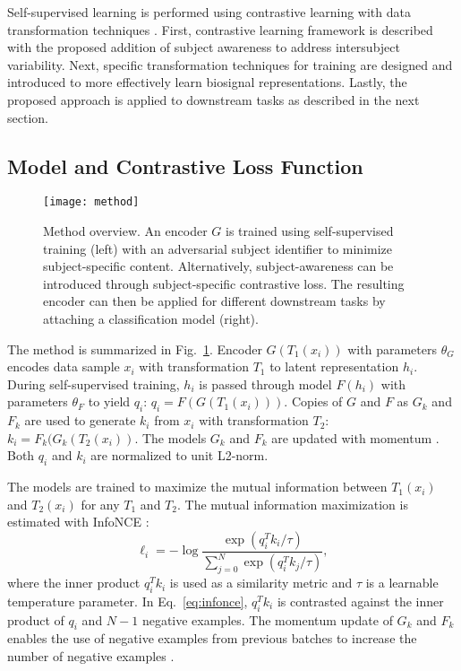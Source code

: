 \documentclass{article}
\begin{document}
Self-supervised learning is performed using contrastive learning with data
transformation techniques
\cite{wu_unsupervised_2018,he_momentum_2019,chen_simple_2020}. First,
contrastive learning framework is described with the proposed addition of
subject awareness to address intersubject variability. Next, specific
transformation techniques for training are designed and introduced to more
effectively learn biosignal representations. Lastly, the proposed approach is
applied to downstream tasks as described in the next section.

\subsection{Model and Contrastive Loss Function}

\begin{figure}
  \centering
  \texttt{[image: method]}
  \caption{Method overview. An encoder $G$ is trained using self-supervised
  training (left) with an adversarial subject identifier to minimize
  subject-specific content. Alternatively, subject-awareness can be introduced
  through subject-specific contrastive loss. The resulting encoder can then be
  applied for different downstream tasks by attaching a classification model
  (right).}
  \label{fig:method}
\end{figure}

The method is summarized in Fig.~\ref{fig:method}. Encoder $G(T_1(x_i))$ with
parameters $\theta_G$ encodes data sample $x_i$ with transformation $T_1$ to
latent representation $h_i$. During self-supervised training, $h_i$ is passed
through model $F(h_i)$ with parameters $\theta_F$ to yield $q_i$: $q_i =
F\left(G\left(T_1\left(x_i\right)\right)\right)$. Copies of $G$ and $F$ as $G_k$
and $F_k$ are used to generate $k_i$ from $x_i$ with transformation $T_2$: $k_i
= F_k(G_k(T_2(x_i))$. The models $G_k$ and $F_k$ are updated with momentum
\cite{he_momentum_2019}. Both $q_i$ and $k_i$ are normalized to unit L2-norm.

The models are trained to maximize the mutual information between $T_1(x_i)$ and
$T_2(x_i)$ for any $T_1$ and $T_2$. The mutual information maximization is
estimated with InfoNCE
\cite{gutmann_noise-contrastive_2010,oord_representation_2019}:
\begin{equation}
  \ell_{i} = -\log{\frac{\exp{\left(q_i^T k_i / \tau\right)}}{\sum_{j=0}^N\exp{\left(q_i^Tk_j/\tau\right)}}},
  \label{eq:infonce}
\end{equation}
where the inner product $q_i^Tk_i$ is used as a similarity metric and $\tau$ is
a learnable temperature parameter. In Eq.~\ref{eq:infonce}, $q_i^T k_i$ is
contrasted against the inner product of $q_i$ and $N-1$ negative examples. The
momentum update of $G_k$ and $F_k$ enables the use of negative examples from
previous batches to increase the number of negative examples
\cite{he_momentum_2019}.
\end{document}
